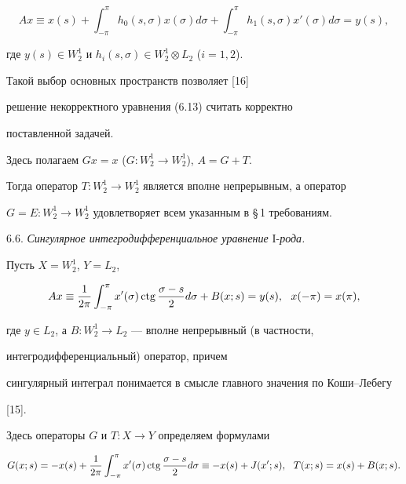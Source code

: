 \begin{equation}


Ax \equiv x(s)+\int_{-\pi}^{\pi}h_0(s,\sigma)x(\sigma)d\sigma+


\int_{-\pi}^{\pi}h_1(s,\sigma)x'(\sigma)d\sigma=y(s),


\end{equation}


где $y(s)\in W_2^1$ и $h_i(s,\sigma) \in W_2^1 \otimes L_2$ ($i=1,2$).


Такой выбор основных пространств позволяет [16] 


решение некорректного уравнения (6.13) считать корректно


поставленной задачей. 


Здесь полагаем $Gx=x$ ($G:W_2^1\to W_2^1$), $A=G+T$.


Тогда оператор $T:W_2^1\to W_2^1$ является вполне непрерывным, а оператор


$G=E:W_2^1\to W_2^1$ удовлетворяет всем указанным в \S\,1 требованиям.


\smallskip





6.6. {\it Сингулярное интегродифференциальное уравнение} I-{\it рода.} 


Пусть $X=W_2^1$, $Y=L_2$, 


\begin{equation}


Ax\equiv \frac{1}{2\pi}\int_{-\pi}^{\pi}x'(\sigma)\ctg


\frac{\sigma-s}{2}d\sigma+B(x;s)=y(s),\ \ x(-\pi)=x(\pi),


\end{equation}


где $y \in L_2$, а $B:W_2^1\to L_2$ --- вполне непрерывный (в частности,


интегродифференциальный) оператор, причем


сингулярный интеграл понимается в смысле главного значения по Коши--Лебегу


[15].





Здесь операторы $G$ и $T:X\to Y$ определяем формулами


\begin{equation}


G(x;s)=-x(s)+\frac{1}{2\pi}\int_{-\pi}^{\pi}x'(\sigma)\ctg


\frac{\sigma-s}{2}d\sigma\equiv -x(s)+J(x';s),\ \


T(x;s)=x(s)+B(x;s).


\end{equation}


